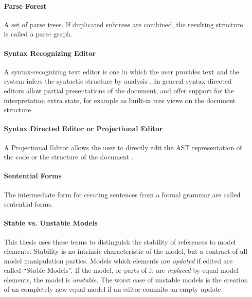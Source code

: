 \paragraph{Parse Forest} 
A set of parse trees. If duplicated subtrees are combined, the resulting structure is called a parse graph. \cite{ParserBook}

\paragraph{Syntax Recognizing Editor} A syntax-recognizing text editor is one in which the user provides text and the system infers the syntactic structure by analysis \cite{pan}. In general syntax-directed editors allow partial presentations of the document, and offer support for the interpretation extra state, for example as built-in tree views on the document structure. \cite{proxima}

\paragraph{Syntax Directed Editor or Projectional Editor} A Projectional Editor allows the user to directly edit the AST representation of the code or the structure of the document \cite{MPS}. 

\paragraph{Sentential Forms}   
The intermediate form for creating sentences from a formal grammar are called sentential forms. \cite{ParserBook}

\paragraph{Stable vs. Unstable Models}
This thesis uses these terms to distinguish the stability of references to model elements. Stability is no intrinsic characteristic of the model, but a contract of all model manipulation parties. Models which elements are \emph{updated} if edited are called ``Stable Models''. If the model, or parts of it are \emph{replaced} by equal model elements, the model is \emph{unstable}. The worst case of unstable models is the creation of an completely new equal model if an editor commits an empty update.

